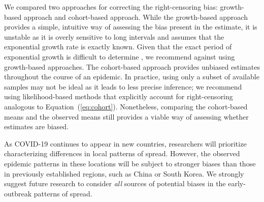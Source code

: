 \documentclass[12pt]{article}
\newcommand{\eref}[1]{(\ref{eq:#1})}
\begin{document}
We compared two approaches for correcting the right-censoring bias: growth-based approach and cohort-based approach.
While the growth-based approach provides a simple, intuitive way of assessing the bias present in the estimate, it is unstable as it is overly sensitive to long intervals and assumes that the exponential growth rate is exactly known.
Given that the exact period of exponential growth is difficult to determine \citep{ma2014estimating}, we recommend against using growth-based approaches.
The cohort-based approach provides unbiased estimates throughout the course of an epidemic.
In practice, using only a subset of available samples may not be ideal as it leads to less precise inference;
we recommend using likelihood-based methods that explicitly account for right-censoring analogous to Equation~\eref{cohort}.
Nonetheless, comparing the cohort-based means and the observed means still provides a viable way of assessing whether estimates are biased.

As COVID-19 continues to appear in new countries, researchers will prioritize characterizing differences in local patterns of spread.
However, the observed epidemic patterns in these locations will be subject to stronger biases than those in previously established regions, such as China or South Korea.
We strongly suggest future research to consider \emph{all} sources of potential biases in the early-outbreak patterns of spread.


\end{document}
